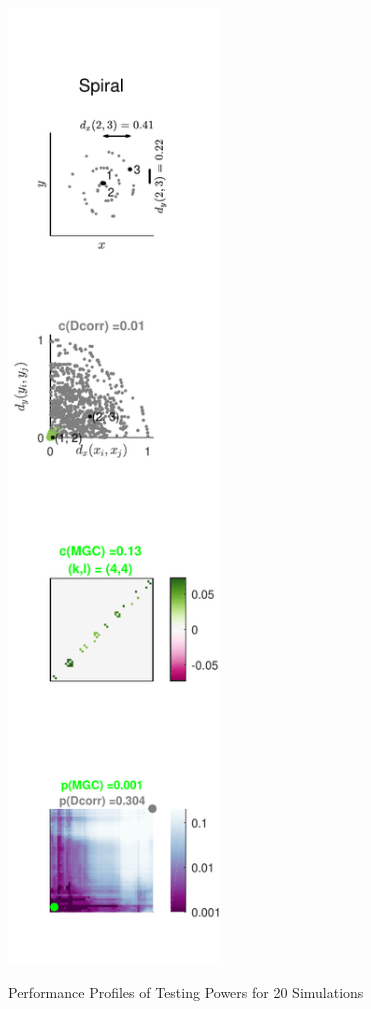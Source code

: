 \documentclass[12pt]{article}
\begin{document}
\begin{figure}[htbp]
{\includegraphics[width=0.5\textwidth]{../Figures/Fig8}
}
\caption{Performance Profiles of Testing Powers for 20 Simulations}
\label{figSim3}
\end{figure}
\end{document}
